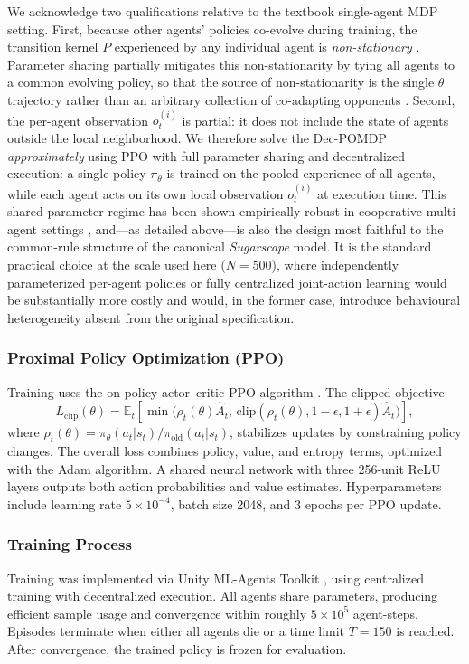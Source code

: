 \documentclass[pdflatex,sn-mathphys-num]{sn-jnl}%
\theoremstyle{thmstyleone}%
\theoremstyle{thmstyletwo}%
\theoremstyle{thmstylethree}%
\begin{document}
We acknowledge two qualifications relative to the textbook single-agent MDP setting.  
First, because other agents' policies co-evolve during training, the transition kernel $P$ experienced by any individual agent is \emph{non-stationary} \citep{Lowe2017, Foerster2018}.  
Parameter sharing partially mitigates this non-stationarity by tying all agents to a common evolving policy, so that the source of non-stationarity is the single $\theta$ trajectory rather than an arbitrary collection of co-adapting opponents \citep{Yu2022}.  
Second, the per-agent observation $o_t^{(i)}$ is partial: it does not include the state of agents outside the local neighborhood.  
We therefore solve the Dec-POMDP \emph{approximately} using PPO with full parameter sharing and decentralized execution: a single policy $\pi_\theta$ is trained on the pooled experience of all agents, while each agent acts on its own local observation $o_t^{(i)}$ at execution time.  
This shared-parameter regime has been shown empirically robust in cooperative multi-agent settings \citep{Yu2022}, and---as detailed above---is also the design most faithful to the common-rule structure of the canonical \textit{Sugarscape} model.  
It is the standard practical choice at the scale used here ($N = 500$), where independently parameterized per-agent policies or fully centralized joint-action learning would be substantially more costly and would, in the former case, introduce behavioural heterogeneity absent from the original specification.

\subsubsection{Proximal Policy Optimization (PPO)}
Training uses the on-policy actor--critic PPO algorithm \citep{Schulman2017}.  
The clipped objective
\[
L_{\text{clip}}(\theta)=\mathbb{E}_t\!\left[\min\!\big(\rho_t(\theta)\hat{A}_t,
\,\text{clip}(\rho_t(\theta),1-\epsilon,1+\epsilon)\hat{A}_t\big)\right],
\]
where \(\rho_t(\theta)=\pi_\theta(a_t|s_t)/\pi_{\text{old}}(a_t|s_t)\), stabilizes updates by constraining policy changes.  
The overall loss combines policy, value, and entropy terms, optimized with the Adam algorithm.  
A shared neural network with three 256-unit ReLU layers outputs both action probabilities and value estimates.  
Hyperparameters include learning rate \(5\times10^{-4}\), batch size 2048, and 3 epochs per PPO update.

\subsubsection{Training Process}
Training was implemented via Unity ML-Agents Toolkit \citep{Unity2025}, using centralized training with decentralized execution.  
All agents share parameters, producing efficient sample usage and convergence within roughly \(5\times10^5\) agent-steps.  
Episodes terminate when either all agents die or a time limit \(T=150\) is reached.  
After convergence, the trained policy is frozen for evaluation.
\end{document}
